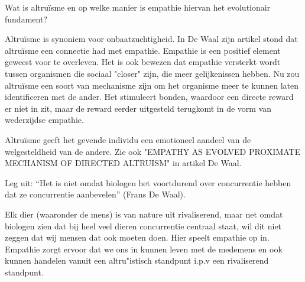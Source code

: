 \documentclass[main.tex]{subfiles}
\begin{document}
\begin{examenvraag}
    \begin{vraag}
        Wat is altruïsme en op welke manier is empathie hiervan het evolutionair fundament?
    \end{vraag}

    \begin{antwoord}
    	Altru\"{i}sme is synoniem voor onbaatzuchtigheid.
    	In De Waal zijn artikel stond dat altru\"{i}sme een connectie had met empathie.
		Empathie is een positief element geweest voor te overleven. 
    	Het is ook bewezen dat empathie versterkt wordt tussen organismen die sociaal "closer" zijn, die meer gelijkenissen hebben.
    	Nu zou altru\"{i}sme een soort van mechanisme zijn om het organisme meer te kunnen laten identificeren met de ander.
    	Het stimuleert bonden, waardoor een directe reward er niet in zit, maar de reward eerder uitgesteld terugkomt in de vorm
		van wederzijdse empathie. 
		
		Altru\"{i}sme geeft het gevende individu een emotioneel aandeel van de welgesteldheid van de andere.
    	Zie ook "EMPATHY AS EVOLVED PROXIMATE MECHANISM OF DIRECTED ALTRUISM" in artikel De Waal.
    	
    \end{antwoord}
\end{examenvraag}


\begin{examenvraag}
    \begin{vraag}
        Leg uit: “Het is niet omdat biologen het voortdurend over concurrentie hebben dat ze concurrentie aanbevelen” (Frans De Waal).
    \end{vraag}

    \begin{antwoord}
	    Elk dier (waaronder de mens) is van nature uit rivaliserend, maar net omdat biologen zien dat bij heel veel dieren concurrentie centraal staat, wil dit niet zeggen dat wij mensen dat ook moeten doen. Hier speelt empathie op in. Empathie zorgt ervoor dat we ons in kunnen leven met de medemens en ook kunnen handelen vanuit een altru"istisch standpunt i.p.v een rivaliserend standpunt.
    \end{antwoord}
\end{examenvraag}
\end{document}
